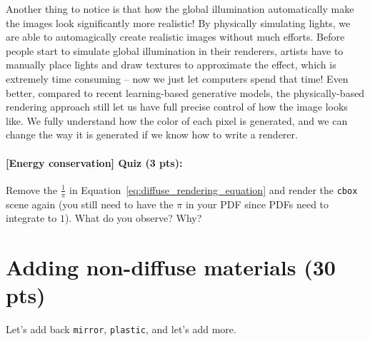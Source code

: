 Another thing to notice is that how the global illumination automatically make the images look significantly more realistic! By physically simulating lights, we are able to automagically create realistic images without much efforts. Before people start to simulate global illumination in their renderers, artists have to manually place lights and draw textures to approximate the effect, which is extremely time consuming -- now we just let computers spend that time! Even better, compared to recent learning-based generative models, the physically-based rendering approach still let us have full precise control of how the image looks like. We fully understand how the color of each pixel is generated, and we can change the way it is generated if we know how to write a renderer.

\paragraph{[Energy conservation] Quiz (3 pts):} Remove the $\frac{1}{\pi}$ in Equation~\eqref{eq:diffuse_rendering_equation} and render the \lstinline{cbox} scene again (you still need to have the $\pi$ in your PDF since PDFs need to integrate to $1$). What do you observe? Why?

\section{Adding non-diffuse materials (30 pts)}
Let's add back \lstinline{mirror}, \lstinline{plastic}, and let's add more. 

